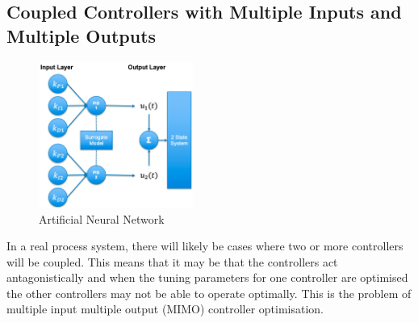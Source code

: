\documentclass[conference]{IEEEtran}
\theoremstyle{definition}
\begin{document}
\subsection{Coupled Controllers with Multiple Inputs and Multiple Outputs}
\begin{figure}
    \centering
    \includegraphics[width=0.45\textwidth]{NN.png}
    \caption{Artificial Neural Network}
    \label{fig:my_label}
\end{figure}
\noindent In a real process system, there will likely be cases where two or more controllers will be coupled. This means that it may be that the controllers act antagonistically and when the tuning parameters for one controller are optimised the other controllers may not be able to operate optimally. This is the problem of multiple input multiple output (MIMO) controller optimisation.
\end{document}

